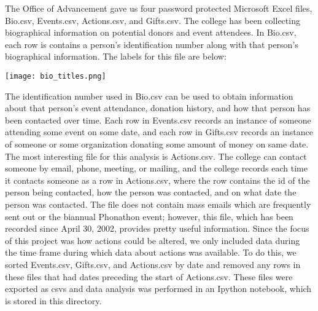 \documentclass[../main.tex]{subfiles}
\begin{document}
The Office of Advancement gave us four password protected Microsoft Excel
files, Bio.csv, Events.csv, Actions.csv, and Gifts.csv. The college has been
collecting biographical information on potential donors and event attendees.
In Bio.csv, each row is contains a person's identification number along with
that person's biographical information. The labels for this file are below:

\vline

\texttt{[image: bio\_titles.png]}

\vline

The identification number used in Bio.csv can be used to obtain information
about that person's event attendance, donation history, and how that person
has been contacted over time. Each row in Events.csv records an instance of
someone attending some event on some date, and each row in Gifts.csv records
an instance of someone or some organization donating some amount of money on
same date. The most interesting file for this analysis is Actions.csv. The
college can contact someone by email, phone, meeting, or mailing, and the
college records each time it contacts someone as a row in Actions.csv, where
the row contains the id of the person being contacted, how the person was
contacted, and on what date the person was contacted. The file does not
contain mass emails which are frequently sent out or the biannual Phonathon
event; however, this file, which has been recorded since April 30, 2002,
provides pretty useful information. Since the focus of this project was how
actions could be altered, we only included data during the time frame during
which data about actions was available. To do this, we sorted Events.csv,
Gifts.csv, and Actions.csv by date and removed any rows in these files that
had dates preceding the start of Actions.csv. These files were exported as
csvs and data analysis was performed in an Ipython notebook, which is stored
in this directory.
\end{document}
